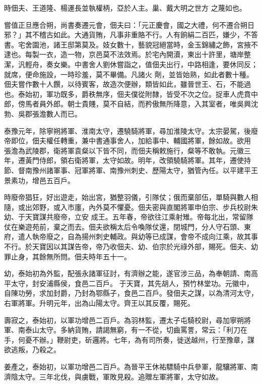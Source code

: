 \begin{pinyinscope}
 時佃夫、王道隆、楊運長並執權柄，亞於人主。巢、戴大明之世方
 之蔑如也。



 嘗值正旦應合朔，尚書奏遷元會，佃夫曰：「元正慶會，國之大禮，何不遷合朔日邪？」其不稽古如此。大通貨賄，凡事非重賂不行。人有餉絹二百匹，嫌少，不答書。宅舍園池，諸王邸第莫及。妓女數十，藝貌冠絕當時，金玉錦繡之飾，宮掖不逮也。每製一衣，造一物，京邑莫不法效焉。於宅內開瀆，東出十許里，塘岸整潔，汎輕舟，奏女樂。中書舍人劉休嘗詣之，值佃夫出行，中路相逢，要休同反；就席，便命施設，一時珍羞，莫不畢備。凡諸火
 劑，並皆始熟，如此者數十種。佃夫嘗作數十人饌，以待賓客，故造次便辦，類皆如此，雖晉世王、石，不能過也。泰始初，軍功既多，爵秩無序，佃夫僕從附隸，皆受不次之位。捉車人虎賁中郎，傍馬者員外郎。朝士貴賤，莫不自結，而矜傲無所降意，入其室者，唯吳興沈勃、吳郡張澹數人而已。



 泰豫元年，除寧朔將軍、淮南太守，遷驍騎將軍，尋加淮陵太守。太宗晏駕，後廢帝即位，佃夫權任轉重，兼中書通事舍人，加給事中、輔國將軍，餘如故。欲用
 張澹為武陵郡，衛將軍袁粲以下皆不同，而佃夫稱敕施行，粲等不敢執。元徽三年，遷黃門侍郎，領右衛將軍，太守如故。明年，改領驍騎將軍。其年，遷使持節、督南豫州諸軍事、冠軍將軍、南豫州刺史、歷陽太守，猶管內任。以平建平王景素功，增邑五百戶。



 時廢帝猖狂，好出遊走，始出宮，猶整羽儀，引隊仗；俄而棄部伍，單騎與數人相隨，或出郊野，或入市廛，內外莫不懼憂。佃夫密與直閣將軍申伯宗、步兵校尉朱幼、于天寶謀共廢帝，立安
 成王。五年春，帝欲往江乘射雉。帝每北出，常留隊仗在樂遊苑前，棄之而去。佃夫欲稱太后令喚隊仗還，閉城門，分人守石頭、東府，遣人執帝廢之，自為揚州刺史輔政。與幼等已成謀，會帝不成向江乘，故其事不行。於天寶因以其謀告帝，帝乃收佃夫、幼、伯宗於光祿外部，賜死。佃夫、幼罪止身，其餘無所問。佃夫時年五十一。



 幼，泰始初為外監，配張永諸軍征討，有濟辦之能，遂官涉三品，為奉朝請、南高平太守，封安浦縣侯，食邑二百戶。
 于天寶，其先胡人，預竹林堂功。元徽中，自陳功勞，求加封爵，乃封為鄂縣子，食邑二百戶。發佃夫之謀，以為清河太守，右軍將軍。升明元年，出為山陽太守。齊王以其反覆，賜死。



 壽寂之，泰始初，以軍功增邑二百戶。為羽林監，遷太子屯騎校尉，尋加寧朔將軍、南泰山太守。多納貨賄，請謁無窮，有一不從，切齒罵詈，常云：「利刀在手，何憂不辦。」鞭尉吏，斫邏將。七年，為有司所奏，徙送越州，行至豫章，謀
 欲逃叛，乃殺之。



 姜產之，泰始初，以軍功增邑二百戶。為晉平王休祐驃騎中兵參軍，龍驤將軍、南濟陰太守。三年北伐，與虜戰，軍敗見殺。追贈左軍將軍，太守如故。




\end{pinyinscope}
